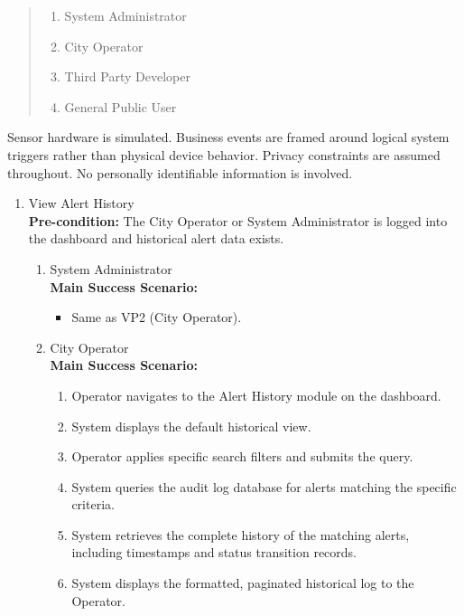 {
\begin{quote}
	\begin{enumerate}[\bf VP1.]
		\item System Administrator
		\item City Operator
		\item {Third Party Developer}
		\item General Public User
	\end{enumerate}
\end{quote}

 Sensor hardware is simulated. Business events are framed around logical system triggers rather than physical device behavior. Privacy constraints are assumed throughout. No personally identifiable information is involved.\\

\begin{enumerate}[{\bf BE1.}]

	\item View Alert History \\
    {\bf Pre-condition:} The City Operator or System Administrator is logged into the dashboard and historical alert data exists.
    \begin{enumerate}[{\bf VP1.}]
        \item System Administrator \\
            {\bf Main Success Scenario:}
                \begin{itemize}
                    \item Same as VP2 (City Operator).
                \end{itemize}
        \item City Operator \\
            {\bf Main Success Scenario:}
                \begin{enumerate}[1. ]
                    \item Operator navigates to the Alert History module on the dashboard.
                    \item System displays the default historical view.
                    \item Operator applies specific search filters and submits the query.
                    \item System queries the audit log database for alerts matching the specific criteria.
                    \item System retrieves the complete history of the matching alerts, including timestamps and status transition records.
                    \item System displays the formatted, paginated historical log to the Operator.
                \end{enumerate}


\end{enumerate}
\end{enumerate}}
